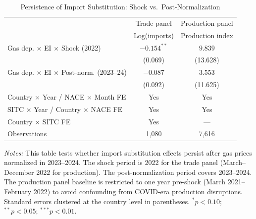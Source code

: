 \begin{table}[htbp]
\centering
\caption{Persistence of Import Substitution: Shock vs.\ Post-Normalization}
\label{tab:persistence}
\begin{tabular}{lcc}
\toprule
 & Trade panel & Production panel \\
 & Log(imports) & Production index \\
\midrule
Gas dep. $\times$ EI $\times$ Shock (2022) & $-0.154^{**}$ & $9.839$ \\
 & (0.069) & (13.628) \\
\addlinespace
Gas dep. $\times$ EI $\times$ Post-norm. (2023--24) & $-0.087$ & $3.553$ \\
 & (0.092) & (11.625) \\
\addlinespace
Country $\times$ Year / NACE $\times$ Month FE & Yes & Yes \\
SITC $\times$ Year / Country $\times$ NACE FE & Yes & Yes \\
Country $\times$ SITC FE & Yes & --- \\
\addlinespace
Observations & 1,080 & 7,616 \\
\bottomrule
\end{tabular}
\begin{tablenotes}[flushleft]
\small
\item \textit{Notes:} This table tests whether import substitution effects persist after gas prices normalized in 2023--2024. The shock period is 2022 for the trade panel (March--December 2022 for production). The post-normalization period covers 2023--2024. The production panel baseline is restricted to one year pre-shock (March 2021--February 2022) to avoid confounding from COVID-era production disruptions. Standard errors clustered at the country level in parentheses. $^{*}p<0.10$; $^{**}p<0.05$; $^{***}p<0.01$.
\end{tablenotes}
\end{table}
